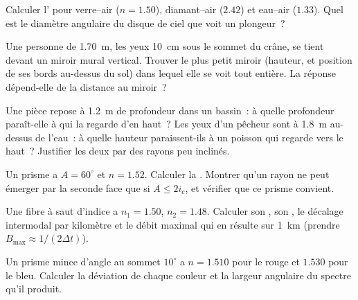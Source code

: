 \begin{exercise}[$\star$]\label{exo:b1:rays-reflection-refraction:3}
Calculer l' pour verre--air ($n = 1.50$), diamant--air
($2.42$) et eau--air ($1.33$). Quel est le diamètre angulaire du disque
de ciel que voit un plongeur~?
\end{exercise}

\begin{exercise}[$\star$]\label{exo:b1:rays-reflection-refraction:4}
Une personne de \qty{1.70}{m}, les yeux \qty{10}{cm} sous le sommet du
crâne, se tient devant un miroir mural vertical. Trouver le plus petit
miroir (hauteur, et position de ses bords au-dessus du sol) dans lequel
elle se voit tout entière. La réponse dépend-elle de la distance au
miroir~?
\end{exercise}

\begin{exercise}[$\star\star$]\label{exo:b1:rays-reflection-refraction:5}
Une pièce repose à \qty{1.2}{m} de profondeur dans un bassin~: à quelle
profondeur paraît-elle à qui la regarde d'en haut~? Les yeux d'un
pêcheur sont à \qty{1.8}{m} au-dessus de l'eau~: à quelle hauteur
paraissent-ils à un poisson qui regarde vers le haut~? Justifier les
deux par des rayons peu inclinés.
\end{exercise}

\begin{exercise}[$\star\star$]\label{exo:b1:rays-reflection-refraction:6}
Un prisme a $A = 60^\circ$ et $n = 1.52$. Calculer la . Montrer qu'un rayon ne peut émerger par la seconde face que si
$A \leq 2 i_c$, et vérifier que ce prisme convient.
\end{exercise}

\begin{exercise}[$\star\star$]\label{exo:b1:rays-reflection-refraction:7}
Une fibre à saut d'indice a $n_1 = 1.50$, $n_2 = 1.48$. Calculer son
, son , le décalage intermodal par
kilomètre et le débit maximal qui en résulte sur \qty{1}{km}
(prendre $B_{\max} \approx 1/(2\Delta t)$).
\end{exercise}

\begin{exercise}[$\star\star$]\label{exo:b1:rays-reflection-refraction:8}
Un prisme mince d'angle au sommet $10^\circ$ a $n = 1.510$ pour le rouge
et $1.530$ pour le bleu. Calculer la déviation de chaque couleur et la
largeur angulaire du spectre qu'il produit.
\end{exercise}

